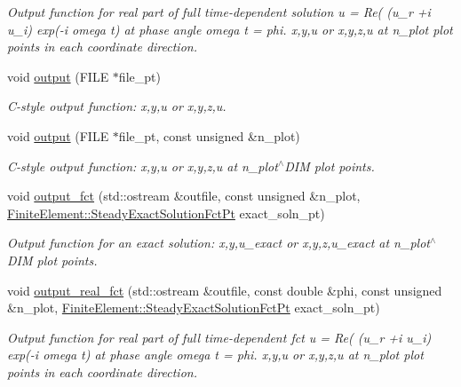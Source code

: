 \begin{DoxyCompactItemize}
\begin{DoxyCompactList}\small\item\em Output function for real part of full time-\/dependent solution u = Re( (u\+\_\+r +i u\+\_\+i) exp(-\/i omega t) at phase angle omega t = phi. x,y,u or x,y,z,u at n\+\_\+plot plot points in each coordinate direction. \end{DoxyCompactList}\item 
void \hyperlink{classoomph_1_1QHelmholtzElement_ac30733fd570c0f78f87ed4a7c542cc5a}{output} (F\+I\+LE $\ast$file\+\_\+pt)
\begin{DoxyCompactList}\small\item\em C-\/style output function\+: x,y,u or x,y,z,u. \end{DoxyCompactList}\item 
void \hyperlink{classoomph_1_1QHelmholtzElement_a235f2ddc4141b070590e8e19f1924b21}{output} (F\+I\+LE $\ast$file\+\_\+pt, const unsigned \&n\+\_\+plot)
\begin{DoxyCompactList}\small\item\em C-\/style output function\+: x,y,u or x,y,z,u at n\+\_\+plot$^\wedge$\+D\+IM plot points. \end{DoxyCompactList}\item 
void \hyperlink{classoomph_1_1QHelmholtzElement_ae560b649d5604bfa9a49e0cd7fb37d6f}{output\+\_\+fct} (std\+::ostream \&outfile, const unsigned \&n\+\_\+plot, \hyperlink{classoomph_1_1FiniteElement_a690fd33af26cc3e84f39bba6d5a85202}{Finite\+Element\+::\+Steady\+Exact\+Solution\+Fct\+Pt} exact\+\_\+soln\+\_\+pt)
\begin{DoxyCompactList}\small\item\em Output function for an exact solution\+: x,y,u\+\_\+exact or x,y,z,u\+\_\+exact at n\+\_\+plot$^\wedge$\+D\+IM plot points. \end{DoxyCompactList}\item 
void \hyperlink{classoomph_1_1QHelmholtzElement_a91d895b690a27d2a3cffb7ebb6b7c8f8}{output\+\_\+real\+\_\+fct} (std\+::ostream \&outfile, const double \&phi, const unsigned \&n\+\_\+plot, \hyperlink{classoomph_1_1FiniteElement_a690fd33af26cc3e84f39bba6d5a85202}{Finite\+Element\+::\+Steady\+Exact\+Solution\+Fct\+Pt} exact\+\_\+soln\+\_\+pt)
\begin{DoxyCompactList}\small\item\em Output function for real part of full time-\/dependent fct u = Re( (u\+\_\+r +i u\+\_\+i) exp(-\/i omega t) at phase angle omega t = phi. x,y,u or x,y,z,u at n\+\_\+plot plot points in each coordinate direction. \end{DoxyCompactList}\item 

\end{DoxyCompactItemize}
